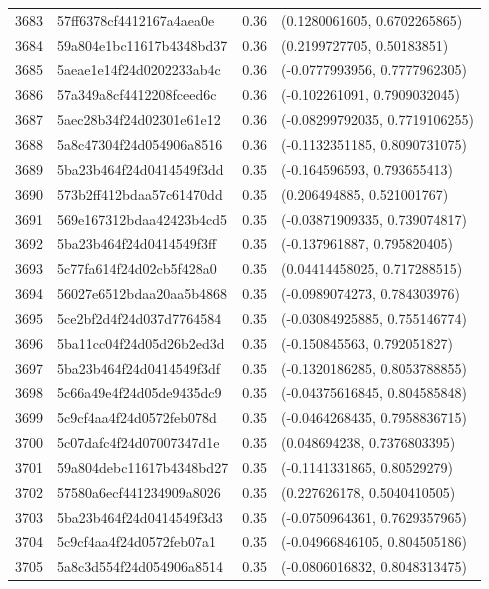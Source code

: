 \begin{table}[ht]
\begin{tabular}{rlrl}
  3683 & 57ff6378cf4412167a4aea0e & 0.36 & (0.1280061605, 0.6702265865) \\ 
  3684 & 59a804e1bc11617b4348bd37 & 0.36 & (0.2199727705, 0.50183851) \\ 
  3685 & 5aeae1e14f24d0202233ab4c & 0.36 & (-0.0777993956, 0.7777962305) \\ 
  3686 & 57a349a8cf4412208fceed6c & 0.36 & (-0.102261091, 0.7909032045) \\ 
  3687 & 5aec28b34f24d02301e61e12 & 0.36 & (-0.08299792035, 0.7719106255) \\ 
  3688 & 5a8c47304f24d054906a8516 & 0.36 & (-0.1132351185, 0.8090731075) \\ 
  3689 & 5ba23b464f24d0414549f3dd & 0.35 & (-0.164596593, 0.793655413) \\ 
  3690 & 573b2ff412bdaa57c61470dd & 0.35 & (0.206494885, 0.521001767) \\ 
  3691 & 569e167312bdaa42423b4cd5 & 0.35 & (-0.03871909335, 0.739074817) \\ 
  3692 & 5ba23b464f24d0414549f3ff & 0.35 & (-0.137961887, 0.795820405) \\ 
  3693 & 5c77fa614f24d02cb5f428a0 & 0.35 & (0.04414458025, 0.717288515) \\ 
  3694 & 56027e6512bdaa20aa5b4868 & 0.35 & (-0.0989074273, 0.784303976) \\ 
  3695 & 5ce2bf2d4f24d037d7764584 & 0.35 & (-0.03084925885, 0.755146774) \\ 
  3696 & 5ba11cc04f24d05d26b2ed3d & 0.35 & (-0.150845563, 0.792051827) \\ 
  3697 & 5ba23b464f24d0414549f3df & 0.35 & (-0.1320186285, 0.8053788855) \\ 
  3698 & 5c66a49e4f24d05de9435dc9 & 0.35 & (-0.04375616845, 0.804585848) \\ 
  3699 & 5c9cf4aa4f24d0572feb078d & 0.35 & (-0.0464268435, 0.7958836715) \\ 
  3700 & 5c07dafc4f24d07007347d1e & 0.35 & (0.048694238, 0.7376803395) \\ 
  3701 & 59a804debc11617b4348bd27 & 0.35 & (-0.1141331865, 0.80529279) \\ 
  3702 & 57580a6ecf441234909a8026 & 0.35 & (0.227626178, 0.5040410505) \\ 
  3703 & 5ba23b464f24d0414549f3d3 & 0.35 & (-0.0750964361, 0.7629357965) \\ 
  3704 & 5c9cf4aa4f24d0572feb07a1 & 0.35 & (-0.04966846105, 0.804505186) \\ 
  3705 & 5a8c3d554f24d054906a8514 & 0.35 & (-0.0806016832, 0.8048313475) \\ 

\end{tabular}
\end{table}
